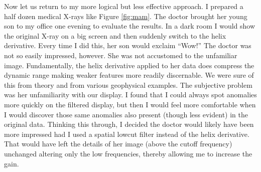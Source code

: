 



\par
Now let us return to my more logical but less effective approach.
I prepared a half dozen medical X-rays like Figure 
\ref{fig:mam}.
The doctor brought her young son to my office one evening
to evaluate the results.
In a dark room I would show the original X-ray on a big screen
and then suddenly switch to the helix derivative.
Every time I did this, her son would exclaim ``Wow!''
The doctor was not so easily impressed, however.
She was not accustomed to the unfamiliar image.
Fundamentally, the helix derivative applied to her data
does compress the dynamic range making weaker features more readily discernable.
We were sure of this from theory and from
various geophysical examples.
The subjective problem was her unfamiliarity with our display.
I found that I could always spot anomalies more quickly
on the filtered display, but then I would feel more comfortable
when I would discover those same anomalies also present
(though less evident) in the original data.
Thinking this through, I decided the doctor would likely have
been more impressed
had I used a spatial lowcut filter instead of the helix derivative.
That would have left the details of her image
(above the cutoff frequency)
unchanged
altering
only the low frequencies,
thereby allowing me to increase the gain.

